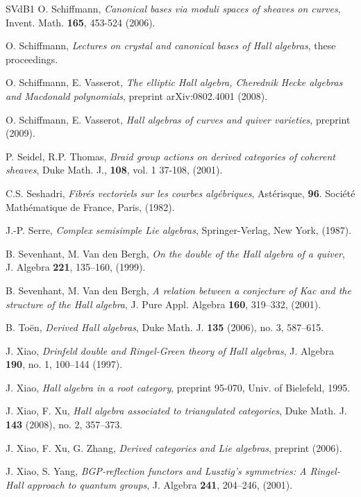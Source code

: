 \documentclass[a4paper,10pt]{amsart}
\numberwithin{equation}{section}
\begin{document}
{{\begin{thebibliography}{SVdB1}
O. Schiffmann, \emph{Canonical bases via moduli spaces of sheaves on curves}, Invent. Math. \textbf{165}, 453-524 (2006).

O. Schiffmann, \emph{Lectures on crystal and canonical bases of Hall algebras}, these proceedings.

O. Schiffmann, E. Vasserot, \emph{The elliptic Hall algebra, Cherednik Hecke algebras and Macdonald polynomials}, preprint  arXiv:0802.4001 (2008).

O. Schiffmann, E. Vasserot, \emph{Hall algebras of curves and quiver varieties}, preprint (2009).

P. Seidel, R.P. Thomas, \emph{Braid group actions on derived categories of coherent sheaves}, Duke Math. J., \textbf{108}, vol. 1 37-108, (2001).

C.S. Seshadri, \emph{Fibr\'es vectoriels sur les courbes alg\'ebriques}, Ast\'erisque, \textbf{96}. Soci\'et\'e Math\'ematique de France, Paris, (1982).

J.-P. Serre, \emph{Complex semisimple Lie algebras}, Springer-Verlag, New York, (1987).

B. Sevenhant, M. Van den Bergh, \emph{On the double of the Hall algebra of a quiver}, J. Algebra \textbf{221}, 135--160, (1999).

B. Sevenhant, M. Van den Bergh, \emph{A relation between a conjecture of Kac and the structure of the Hall algebra}, J. Pure Appl. Algebra \textbf{160}, 319--332, (2001).

B. To\"en, \emph{Derived Hall algebras}, Duke Math. J. \textbf{135} (2006), no. 3, 587--615.

J. Xiao, \emph{ Drinfeld double and Ringel-Green theory of Hall algebras}, J. Algebra \textbf{190}, no. 1, 100--144 (1997).

J. Xiao, \emph{Hall algebra in a root category},  preprint 95-070, Univ. of Bielefeld, 1995.

J. Xiao, F. Xu, \emph{Hall algebra associated to triangulated categories}, Duke Math. J. \textbf{143} (2008), no. 2, 357--373.

J. Xiao, F. Xu, G. Zhang, \emph{Derived categories and Lie algebras}, preprint (2006).

J. Xiao, S. Yang, \emph{BGP-reflection functors and Lusztig's symmetries: A Ringel-Hall approach to quantum groups}, J. Algebra \textbf{241}, 204--246, (2001).


\end{thebibliography}}}
\end{document}

